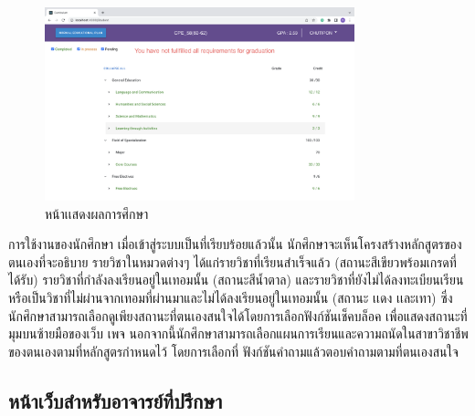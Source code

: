 \begin{figure}[H]
  \begin{center}
    \includegraphics[width=0.8\textwidth]{student.png}
    \caption{หน้าเเสดงผลการศึกษา}
    \label{fig:student}
  \end{center}
\end{figure}

การใช้งานของนักศึกษา เมื่อเข้าสู่ระบบเป็นที่เรียบร้อยแล้วนั้น นักศึกษาจะเห็นโครงสร้างหลักสูตรของตนเองที่จะอธิบาย
รายวิชาในหมวดต่างๆ ได้แก่รายวิชาที่เรียนสำเร็จแล้ว (สถานะสีเขียวพร้อมเกรดที่ได้รับ) รายวิชาที่กำลังลงเรียนอยู่ในเทอมนั้น
(สถานะสีนํ้าตาล) และรายวิชาที่ยังไม่ได้ลงทะเบียนเรียนหรือเป็นวิชาที่ไม่ผ่านจากเทอมที่ผ่านมาและไม่ได้ลงเรียนอยู่ในเทอมนั้น (สถานะ
เเดง เเละเทา) ซึ่งนักศึกษาสามารถเลือกดูเพียงสถานะที่ตนเองสนใจได้โดยการเลือกฟังก์ชันเช็คบล็อค เพื่อแสดงสถานะที่มุมบนซ้ายมือของเว็บ
เพจ นอกจากนี้นักศึกษาสามารถเลือกแผนการเรียนและความถนัดในสาขาวิชาชีพของตนเองตามที่หลักสูตรกำหนดไว้ โดยการเลือกที่
ฟังก์ชันคำถามแล้วตอบคำถามตามที่ตนเองสนใจ


\subsection{หน้าเว็บสำหรับอาจารย์ที่ปรึกษา}

